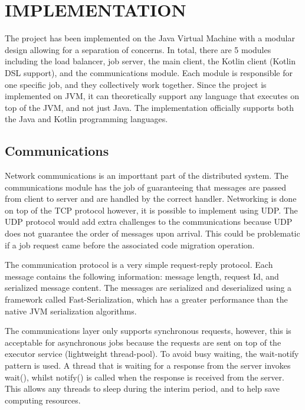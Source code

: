 \section{IMPLEMENTATION}\label{sec:impl}

The project has been implemented on the Java Virtual Machine with a modular design allowing for
a separation of concerns.
In total, there are 5 modules including the load balancer, job server, the main client,
the Kotlin client (Kotlin DSL support), and the communications module.
Each module is responsible for one specific job, and they collectively work together.
Since the project is implemented on JVM, it can theoretically support any language
that executes on top of the JVM, and not just Java.
The implementation officially supports both the Java and Kotlin programming languages.

\subsection{Communications}\label{subsec:communcations}

Network communications is an importtant part of the distributed system.
The communications module has the job of guaranteeing that messages
are passed from client to server and are handled by the correct handler.
Networking is done on top of the TCP protocol however, it is possible to
implement using UDP.
The UDP protocol would add extra challenges to the communications because
UDP does not guarantee the order of messages upon arrival.
This could be problematic if a job request came before the associated
code migration operation.

The communication protocol is a very simple request-reply protocol.
Each message contains the following information:
message length, request Id, and serialized message content.
The messages are serialized and deserialized using a framework called Fast-Serialization,
which has a greater performance than the native JVM serialization algorithms.

The communications layer only supports synchronous requests, however, this is acceptable
for asynchronous jobs because the requests are sent on top of the executor service (lightweight thread-pool).
To avoid busy waiting, the wait-notify pattern is used.
A thread that is waiting for a response from the server invokes wait(),
whilst notify() is called when the response is received from the server.
This allows any threads to sleep during the interim period, and to help
save computing resources.

